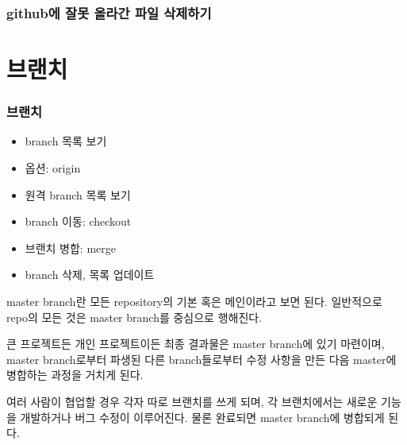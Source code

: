 \documentclass[12pt, a4paper, oneside]{book}
\let\stdsection\section
\renewcommand\section{\newpage\stdsection}
\begin{document}
	\section{github에 잘못 올라간 파일 삭제하기}










	\part 	{브랜치}

	\noptcrule
	\parttoc	
	\minitoc
				


%										
	\section{브랜치}

			\begin{itemize}	[	
							topsep=0.0em,
							itemsep=0.0em,
							leftmargin=6em, 
							labelsep=3em 
							]
				\item 	branch 목록 보기
				\item 	옵션: origin
				\item	원격 branch 목록 보기
				\item	branch 이동: checkout
				\item	브랜치 병합: merge
				\item	branch 삭제, 목록 업데이트
			\end{itemize}


master branch란 모든 repository의 기본 혹은 메인이라고 보면 된다. 
일반적으로 repo의 모든 것은 master branch를 중심으로 행해진다.

큰 프로젝트든 개인 프로젝트이든 최종 결과물은 master branch에 있기 마련이며, 
master branch로부터 파생된 다른 branch들로부터 수정 사항을 만든 다음 
master에 병합하는 과정을 거치게 된다.

여러 사람이 협업할 경우 각자 따로 브랜치를 쓰게 되며, 
각 브랜치에서는 새로운 기능을 개발하거나 버그 수정이 이루어진다. 
물론 완료되면 master branch에 병합되게 된다.
\end{document}
